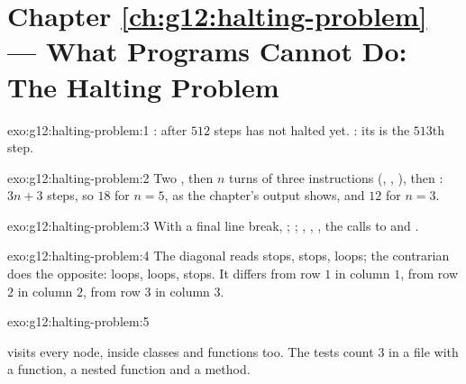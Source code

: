 \section*{Chapter \ref{ch:g12:halting-problem} --- What Programs Cannot Do: The Halting Problem}

\begin{solution}{exo:g12:halting-problem:1}
: after $512$ steps  has not halted yet. : its  is the
$513$th step.
\end{solution}

\begin{solution}{exo:g12:halting-problem:2}
Two , then $n$ turns of three instructions (, , ), then :
$3n + 3$ steps, so $18$ for $n = 5$, as the chapter's output shows, and $12$ for $n = 3$.
\end{solution}

\begin{solution}{exo:g12:halting-problem:3}
With a final line break, ; ; , , , the calls to  and .
\end{solution}

\begin{solution}{exo:g12:halting-problem:4}
The diagonal reads stops, stops, loops; the contrarian does the opposite: loops, loops, stops. It differs from row $1$
in column $1$, from row $2$ in column $2$, from row $3$ in column $3$.
\end{solution}

\begin{solution}{exo:g12:halting-problem:5}
\smallskip\noindent\hspace*{2em}

\noindent\hspace*{4em}

\noindent\hspace*{4em}

\noindent\hspace*{8em}

\smallskip\noindent {} visits every node, inside classes and functions too. The tests count $3$ in a
file with a function, a nested function and a method.
\end{solution}

